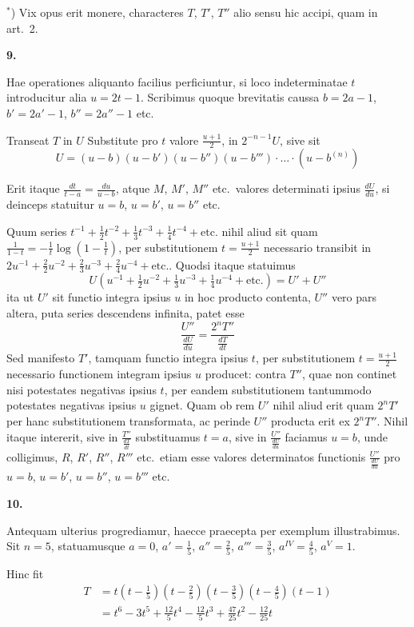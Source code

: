 \documentclass[12pt,a4paper]{article}
\newcommand{\art}[1]{\par\medskip\noindent\textbf{#1.}\par\nopagebreak\smallskip}
\begin{document}
\vspace{0.5em}
\noindent$^*$) Vix opus erit monere, characteres $T$, $T'$, $T''$ alio sensu hic accipi, quam in art.\ 2.

\art{9}

Hae operationes aliquanto facilius perficiuntur, si loco indeterminatae $t$ introducitur alia $u=2t-1$. Scribimus quoque brevitatis caussa $b=2a-1$, $b'=2a'-1$, $b''=2a''-1$ etc.

Transeat $T$ in $U$ Substitute pro $t$ valore $\frac{u+1}{2}$, in $2^{-n-1}U$, sive sit
\[
U = (u-b)(u-b')(u-b'')(u-b''')\cdot\ldots\cdot(u-b^{(n)})
\]

Erit itaque $\frac{dt}{t-a} = \frac{du}{u-b}$, atque $M$, $M'$, $M''$ etc.\ valores determinati ipsius $\frac{dU}{du}$, si deinceps statuitur $u=b$, $u=b'$, $u=b''$ etc.

Quum series $t^{-1} + \frac{1}{2}t^{-2} + \frac{1}{3}t^{-3} + \frac{1}{4}t^{-4} + \text{etc.}$ nihil aliud sit quam $\frac{1}{1-t} = -\frac{1}{t}\log(1-\frac{1}{t})$, per substitutionem $t=\frac{u+1}{2}$ necessario transibit in $2u^{-1} + \frac{2}{2}u^{-2} + \frac{2}{3}u^{-3} + \frac{2}{4}u^{-4} + \text{etc.}$. Quodsi itaque statuimus
\[
U(u^{-1} + \tfrac{1}{2}u^{-2} + \tfrac{1}{3}u^{-3} + \tfrac{1}{4}u^{-4} + \text{etc.}) = U' + U''
\]
ita ut $U'$ sit functio integra ipsius $u$ in hoc producto contenta, $U''$ vero pars altera, puta series descendens infinita, patet esse
\[
\frac{U''}{\frac{dU}{du}} = \frac{2^n T''}{\frac{dT}{dt}}
\]
Sed manifesto $T'$, tamquam functio integra ipsius $t$, per substitutionem $t=\frac{u+1}{2}$ necessario functionem integram ipsius $u$ producet: contra $T''$, quae non continet nisi potestates negativas ipsius $t$, per eandem substitutionem tantummodo potestates negativas ipsius $u$ gignet. Quam ob rem $U'$ nihil aliud erit quam $2^n T'$ per hanc substitutionem transformata, ac perinde $U''$ producta erit ex $2^n T''$. Nihil itaque intererit, sive in $\frac{T''}{\frac{dT}{dt}}$ substituamus $t=a$, sive in $\frac{U''}{\frac{dU}{du}}$ faciamus $u=b$, unde colligimus, $R$, $R'$, $R''$, $R'''$ etc.\ etiam esse valores determinatos functionis $\frac{U''}{\frac{dU}{du}}$ pro $u=b$, $u=b'$, $u=b''$, $u=b'''$ etc.

\art{10}

Antequam ulterius progrediamur, haecce praecepta per exemplum illustrabimus. Sit $n=5$, statuamusque $a=0$, $a'=\frac{1}{5}$, $a''=\frac{2}{5}$, $a'''=\frac{3}{5}$, $a^{IV}=\frac{4}{5}$, $a^{V}=1$.

Hinc fit
\begin{align*}
T &= t(t-\tfrac{1}{5})(t-\tfrac{2}{5})(t-\tfrac{3}{5})(t-\tfrac{4}{5})(t-1)\\
&= t^6 - 3t^5 + \tfrac{12}{5}t^4 - \tfrac{12}{5}t^3 + \tfrac{47}{25}t^2 - \tfrac{12}{25}t
\end{align*}
\end{document}
